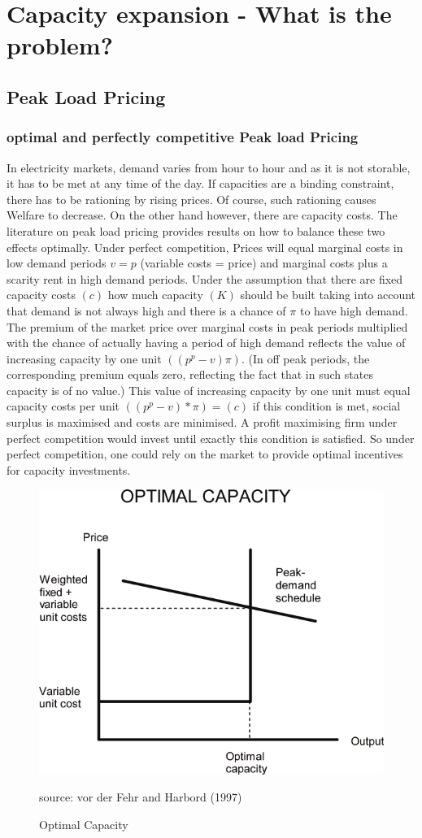 \section{Capacity expansion - What is the problem?}

\subsection{Peak Load Pricing}

\subsubsection{optimal and perfectly competitive Peak load Pricing}

In electricity markets, demand varies from hour to hour and as it is not storable, it has to be met at any time of the day. If capacities are a binding constraint, there has to be rationing by rising prices. Of course, such rationing causes Welfare to decrease. On the other hand however, there are capacity costs. The literature on peak load pricing provides results on how to balance these two effects optimally. Under perfect competition, Prices will equal marginal costs in low demand periods $v=p$ (variable costs = price) and marginal costs plus a scarity rent in high demand periods. Under the assumption that there are fixed capacity costs $(c)$ how much capacity $(K)$ should be built taking into account that demand is not always high and there is a chance of $\pi$ to have high demand. The premium of the market price over marginal costs in peak periods multiplied with the chance of actually having a period of high demand reflects the value of increasing capacity by one unit $((p^p-v)\pi)$. (In off peak periods, the corresponding premium equals zero, reflecting the fact that in such states capacity is of no value.) This value of increasing capacity by one unit must equal capacity costs per unit $((p^p-v)*\pi)=(c)$ if this condition is met, social surplus is maximised and costs are minimised. A profit maximising firm under perfect competition would invest until exactly this condition is satisfied. So under perfect competition, one could rely on the market to provide optimal incentives for capacity investments.

\begin{figure}[h]
\centering
\includegraphics[width=.5\textwidth]{capacity/peak_load_opt}
      \label{peak_load_opt}
      \caption{Optimal Capacity}
      source: vor der Fehr and Harbord (1997)     
\end{figure}

